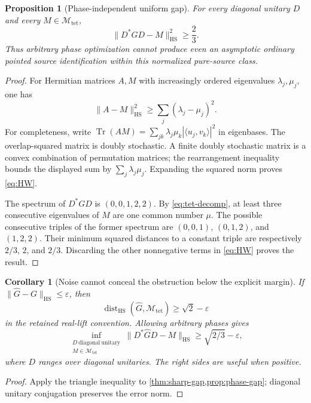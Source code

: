\documentclass[11pt]{article}
\newtheorem{proposition}[proposition]{Proposition}
\newtheorem{corollary}[corollary]{Corollary}
\theoremstyle{definition}
\theoremstyle{remark}
\newcommand{\Tr}{\operatorname{Tr}}
\newcommand{\dist}{\operatorname{dist}}
\newcommand{\HS}{\mathrm{HS}}
\newcommand{\norm}[1]{\lVert#1\rVert}
\newcommand{\ip}[2]{\langle#1,#2\rangle}
\newcommand{\Mtet}{\mathscr M_{\mathrm{tet}}}
\begin{document}
\begin{proposition}[Phase-independent uniform gap]
\label{prop:phase-gap}
For every diagonal unitary $D$ and every $M\in\Mtet$,
\begin{equation}
 \boxed{\norm{D^*GD-M}_{\HS}^2\ge\frac23.}
 \label{eq:phase-gap}
\end{equation}
Thus arbitrary phase optimization cannot produce even an asymptotic ordinary
pointed source identification within this normalized pure-source class.
\end{proposition}
\begin{proof}
For Hermitian matrices $A,M$ with increasingly ordered eigenvalues $\lambda_j,
\mu_j$, one has
\begin{equation}
 \norm{A-M}_{\HS}^2\ge\sum_j(\lambda_j-\mu_j)^2.
 \label{eq:HW}
\end{equation}
For completeness, write $\Tr(AM)=\sum_{jk}\lambda_j\mu_k
|\ip{u_j}{v_k}|^2$ in eigenbases. The overlap-squared matrix is doubly
stochastic. A finite doubly stochastic matrix is a convex combination of
permutation matrices; the rearrangement inequality bounds the displayed
sum by $\sum_j\lambda_j\mu_j$. Expanding the squared norm proves
\eqref{eq:HW}.

The spectrum of $D^*GD$ is $(0,0,1,2,2)$. By
\eqref{eq:tet-decomp}, at least three consecutive eigenvalues of $M$ are
one common number $\mu$. The possible consecutive triples of the former
spectrum are $(0,0,1)$, $(0,1,2)$, and $(1,2,2)$. Their minimum squared
distances to a constant triple are respectively $2/3$, $2$, and $2/3$.
Discarding the other nonnegative terms in \eqref{eq:HW} proves the result.
\end{proof}

\begin{corollary}[Noise cannot conceal the obstruction below the explicit margin]
\label{cor:noise}
If $\norm{\widehat G-G}_{\HS}\le\varepsilon$, then
\[
 \dist_{\HS}(\widehat G,\Mtet)\ge\sqrt2-\varepsilon
\]
in the retained real-lift convention. Allowing arbitrary phases gives
\[
 \inf_{\substack{D\ \mathrm{diagonal\ unitary}\\M\in\Mtet}}\norm{D^*\widehat GD-M}_{\HS}
 \ge\sqrt{2/3}-\varepsilon,
\]
where $D$ ranges over diagonal unitaries. The right sides are useful when
positive.
\end{corollary}
\begin{proof}
Apply the triangle inequality to \cref{thm:sharp-gap,prop:phase-gap};
diagonal unitary conjugation preserves the error norm.
\end{proof}
\end{document}
